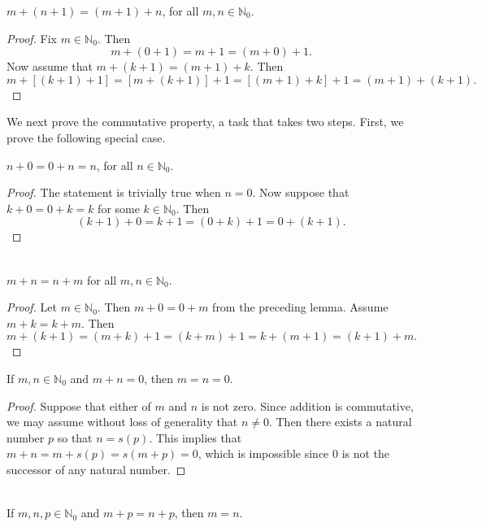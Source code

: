 \begin{lemma}
$m+(n+1) = (m+1)+n$, for all $m,n\in\mathbb{N}_0$.
\end{lemma}
\begin{proof}
Fix $m\in \mathbb{N}_0$.  Then
\[
m+(0+1)=m+1= (m+0)+1.
\]
Now assume that $m+(k+1)=(m+1)+k$.
Then
\[
m+[(k+1)+1]=[m+(k+1)]+1=[(m+1)+k]+1=(m+1)+(k+1).
\]
\end{proof}

We next prove the commutative property, a task that takes
two steps. First, we prove the following special case.

\begin{lemma}
$n+0 = 0+n=n$, for all $n\in \mathbb{N}_0$.
\end{lemma}

\begin{proof}
The statement is trivially true when $n= 0$.
Now suppose that $k+0=0+k=k$ for some $k\in \mathbb{N}_0$.
Then
\[
(k+1) +0 = k+1 = (0+k)+1= 0+(k+1).
\]
\end{proof}

\begin{theorem}{}\\
$m+n=n+m$ for all $m,n\in \mathbb{N}_0$.
\end{theorem}

\begin{proof}
Let $m\in \mathbb{N}_0$. Then $m+0=0+m$ from the preceding lemma.
Assume $m+k=k+m$. Then
\[
m+(k+1)=(m+k)+1=(k+m)+1= k+(m+1) = (k+1)+m.
\]
\end{proof}

\begin{lemma}\label{lem:sum0}
If $m,n\in\mathbb{N}_0$ and $m+n=0$, then $m=n=0$.
\end{lemma}

\begin{proof}
Suppose that either of $m$ and $n$ is not zero. Since addition
is commutative, we may assume without loss of generality that
$n\neq0$.  Then there exists a natural number
$p$ so that $n=s(p)$.  This implies that $m+n=m+s(p)=s(m+p)=0$,
which is impossible since $0$ is not the successor of any
natural number.
\end{proof}

\begin{theorem}{}\\
If $m,n,p\in \mathbb{N}_0$ and $m+p=n+p$, then $m=n$.
\end{theorem}

